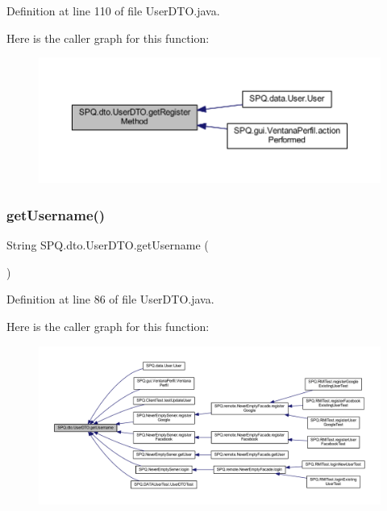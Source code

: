 Definition at line 110 of file User\+D\+T\+O.\+java.

Here is the caller graph for this function\+:
\nopagebreak
\begin{figure}[H]
\begin{center}
\leavevmode
\includegraphics[width=350pt]{class_s_p_q_1_1dto_1_1_user_d_t_o_ab2180112e27f967d77dd4696f88bd2ef_icgraph}
\end{center}
\end{figure}
\mbox{\label{class_s_p_q_1_1dto_1_1_user_d_t_o_a0cd335456c4f53b97069820475742980}} 
\subsubsection{\texorpdfstring{get\+Username()}{getUsername()}}
{\footnotesize\ttfamily String S\+P\+Q.\+dto.\+User\+D\+T\+O.\+get\+Username (\begin{DoxyParamCaption}{ }\end{DoxyParamCaption})}



Definition at line 86 of file User\+D\+T\+O.\+java.

Here is the caller graph for this function\+:
\nopagebreak
\begin{figure}[H]
\begin{center}
\leavevmode
\includegraphics[width=350pt]{class_s_p_q_1_1dto_1_1_user_d_t_o_a0cd335456c4f53b97069820475742980_icgraph}
\end{center}
\end{figure}
\mbox{\label{class_s_p_q_1_1dto_1_1_user_d_t_o_a9ea48b87767eb765aac4f10d0cb9d53a}} 

